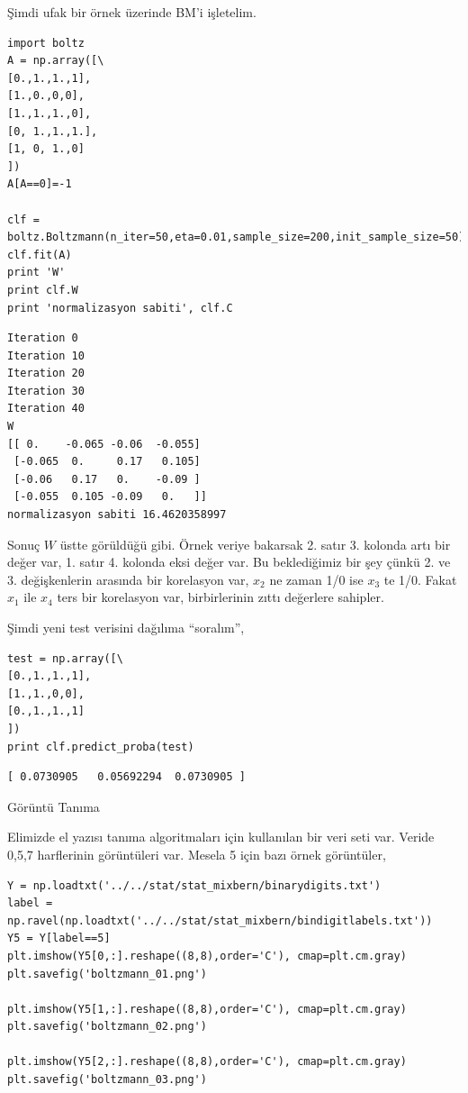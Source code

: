 \documentclass[12pt,fleqn]{article}\usepackage{../../common}
\begin{document}
Şimdi ufak bir örnek üzerinde BM'i işletelim. 

\begin{verbatim}
import boltz
A = np.array([\
[0.,1.,1.,1],
[1.,0.,0,0],
[1.,1.,1.,0],
[0, 1.,1.,1.],
[1, 0, 1.,0]
])
A[A==0]=-1

clf = boltz.Boltzmann(n_iter=50,eta=0.01,sample_size=200,init_sample_size=50)
clf.fit(A)
print 'W'
print clf.W
print 'normalizasyon sabiti', clf.C
\end{verbatim}

\begin{verbatim}
Iteration 0
Iteration 10
Iteration 20
Iteration 30
Iteration 40
W
[[ 0.    -0.065 -0.06  -0.055]
 [-0.065  0.     0.17   0.105]
 [-0.06   0.17   0.    -0.09 ]
 [-0.055  0.105 -0.09   0.   ]]
normalizasyon sabiti 16.4620358997
\end{verbatim}

Sonuç $W$ üstte görüldüğü gibi. Örnek veriye bakarsak 2. satır 3. kolonda
artı bir değer var, 1. satır 4. kolonda eksi değer var. Bu beklediğimiz bir
şey çünkü 2. ve 3. değişkenlerin arasında bir korelasyon var, $x_2$ ne
zaman 1/0 ise $x_3$ te 1/0. Fakat $x_1$ ile $x_4$ ters bir korelasyon var,
birbirlerinin zıttı değerlere sahipler. 

Şimdi yeni test verisini dağılıma ``soralım'', 

\begin{verbatim}
test = np.array([\
[0.,1.,1.,1],
[1.,1.,0,0],
[0.,1.,1.,1]
])    
print clf.predict_proba(test)
\end{verbatim}

\begin{verbatim}
[ 0.0730905   0.05692294  0.0730905 ]
\end{verbatim}

Görüntü Tanıma

Elimizde el yazısı tanıma algoritmaları için kullanılan bir veri seti var.
Veride 0,5,7 harflerinin görüntüleri var. Mesela 5 için bazı örnek
görüntüler,

\begin{verbatim}
Y = np.loadtxt('../../stat/stat_mixbern/binarydigits.txt')
label = np.ravel(np.loadtxt('../../stat/stat_mixbern/bindigitlabels.txt'))
Y5 = Y[label==5]
plt.imshow(Y5[0,:].reshape((8,8),order='C'), cmap=plt.cm.gray)
plt.savefig('boltzmann_01.png')

plt.imshow(Y5[1,:].reshape((8,8),order='C'), cmap=plt.cm.gray)
plt.savefig('boltzmann_02.png')

plt.imshow(Y5[2,:].reshape((8,8),order='C'), cmap=plt.cm.gray)
plt.savefig('boltzmann_03.png')
\end{verbatim}
\end{document}
